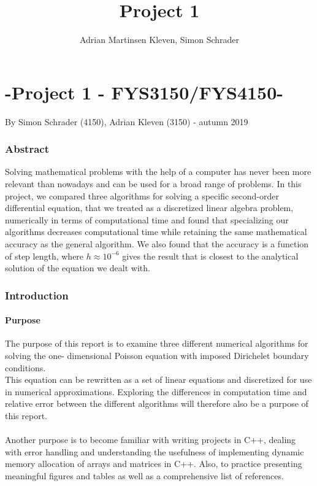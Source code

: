 \documentclass[10pt,a4paper]{article}
\author{Adrian Martinsen Kleven, Simon Schrader}
\title{Project 1}
\begin{document}
\part*{-Project 1 - FYS3150/FYS4150-
}
{\large By Simon Schrader (4150), Adrian Kleven (3150) - autumn 2019
}
\tableofcontents

\listoffigures
\listoftables

 
\clearpage
 
\section{Abstract}
Solving mathematical problems with the help of a computer has never been more relevant than nowadays and can be used for a broad range of problems. In this project, we compared three algorithms for solving a specific second-order differential equation, that we treated as a discretized linear algebra problem, numerically in terms of computational time and found that specializing our algorithms decreases computational time while retaining the same mathematical accuracy as the general algorithm. We also found that the accuracy is a function of step length, where  $h \approx 10^{-6}$ gives the result that is closest to the analytical solution of the equation we dealt with.
\section{Introduction}
\subsection{Purpose} 
The purpose of this report is to examine three different numerical algorithms for solving the one- dimensional Poisson equation with imposed Dirichelet boundary conditions. \\This equation can be rewritten as a set of linear equations and discretized for use in numerical approximations. Exploring the differences in computation time and relative error between the different algorithms will therefore also be a purpose of this report.\\\\
Another purpose is to become familiar with writing projects in C++, dealing with error handling and understanding the usefulness of implementing dynamic memory allocation of arrays and matrices in C++. Also, to practice presenting meaningful figures and tables as well as a comprehensive list of references.
\end{document}
